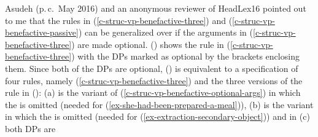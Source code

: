 Asudeh (p.\,c.\ May 2016) and an anonymous reviewer of Head\-Lex16 pointed out to me that the rules in
(\ref{c-struc-vp-benefactive-three}) and (\ref{c-struc-vp-benefactive-passive}) can be generalized over if
the arguments in (\ref{c-struc-vp-benefactive-three}) are made optional. () shows the rule in
(\ref{c-struc-vp-benefactive-three}) with the DPs marked as optional by the brackets enclosing them.
\ea\label{c-struc-vp-benefactive-optional-args}
\z
Since both of the DPs are optional, () is equivalent to a specification of four rules, namely
(\ref{c-struc-vp-benefactive-three}) and the three versions of the rule in ():
\eal
\ex\label{c-struc-vp-benefactive-optional-args-otheta}
\ex\label{c-struc-vp-benefactive-optional-args-obj}
\ex\label{c-struc-vp-benefactive-optional-args-none}
\zl
(a) is the variant of (\ref{c-struc-vp-benefactive-optional-args}) in which the \obj is
omitted (needed for (\ref{ex-she-had-been-prepared-a-meal})), (b) is the variant in which the
\objtheta is omitted (needed for (\ref{ex-extraction-secondary-object})) and in (c) both DPs are
